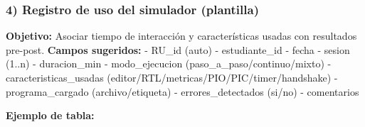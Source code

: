 \documentclass[12pt,oneside]{templates/unerthesis}
\begin{document}
\hypertarget{registro-de-uso-del-simulador-plantilla}{%
\subsubsection{4) Registro de uso del simulador (plantilla)}\label{registro-de-uso-del-simulador-plantilla}}

\textbf{Objetivo:} Asociar tiempo de interacción y características usadas con resultados pre-post.
\textbf{Campos sugeridos:}
- RU\_id (auto)
- estudiante\_id
- fecha
- sesion (1..n)
- duracion\_min
- modo\_ejecucion (paso\_a\_paso/continuo/mixto)
- caracteristicas\_usadas (editor/RTL/metricas/PIO/PIC/timer/handshake)
- programa\_cargado (archivo/etiqueta)
- errores\_detectados (si/no)
- comentarios

\textbf{Ejemplo de tabla:}
\end{document}
